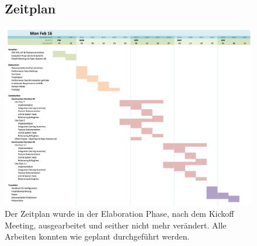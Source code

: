 \clearpage
\begin{figure}
\centering
\subsection{Zeitplan}
\includegraphics[scale=0.45]{mainpart/projektmanagement/img/ganttdiagramm}
Der Zeitplan wurde in der Elaboration Phase, nach dem Kickoff Meeting, ausgearbeitet und seither nicht mehr verändert. Alle Arbeiten konnten wie geplant durchgeführt werden.
\end{figure}
\clearpage